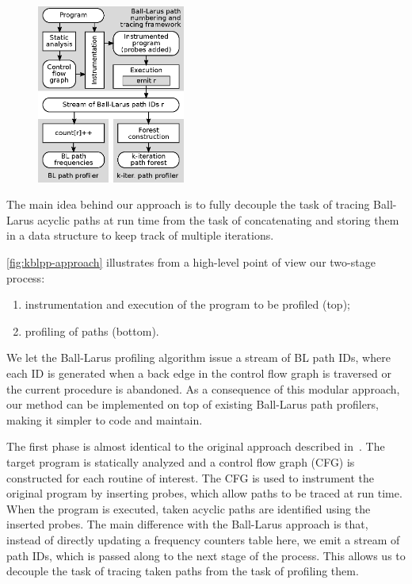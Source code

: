 \ifdefined\noauthorea
\begin{figure}
\vspace{-3mm}
\centering
\includegraphics[width=0.433\textwidth]{figures/kblpp-approach/kblpp-approach.eps}
\captionsetup{width=.47\textwidth}
\caption{\protect}
\end{figure}
\noindent
\fi

\vspace{-2mm}
\noindent The main idea behind our approach is to fully decouple the task of tracing Ball-Larus acyclic paths at run time from the task of concatenating and storing them in a data structure to keep track of multiple iterations.

\myfigure\ref{fig:kblpp-approach} illustrates from a high-level point of view our two-stage process:
\begin{enumerate}[parsep=0pt,itemsep=3pt,topsep=5pt]
\item instrumentation and execution of the program to be profiled (top);
\item profiling of paths (bottom).
\end{enumerate}
We let the Ball-Larus profiling algorithm issue a stream of BL path IDs, where each ID is generated when a back edge in the control flow graph is traversed or the current procedure is abandoned. As a consequence of this modular approach, our method can be implemented on top of existing Ball-Larus path profilers, making it simpler to code and maintain.


The first phase is almost identical to the original approach described in~\cite{Ball96}. The target program is statically analyzed and a control flow graph (CFG) is constructed for each routine of interest. The CFG is used to instrument the original program by inserting probes, which allow paths to be traced at run time. When the program is executed, taken acyclic paths are identified using the inserted probes. The main difference with the Ball-Larus approach is that, instead of directly updating a frequency counters table here, we emit a stream of path IDs, which is passed along to the next stage of the process. This allows us to decouple the task of tracing taken paths from the task of profiling them. 

